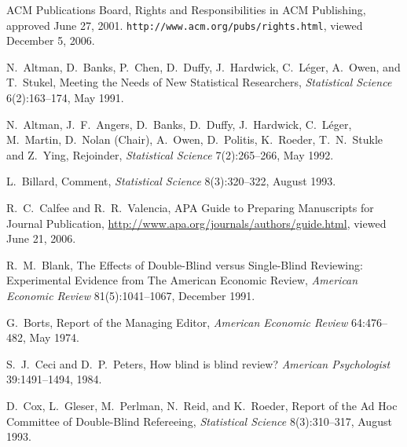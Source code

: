 \documentclass[acmtods,acmnow]{acmtrans2m}
\begin{document}
%
\newcommand{\etalchar}[1]{$^{#1}$}
\begin{thebibliography}{}

{\sc ACM Publications Board}, Rights and Responsibilities in ACM Publishing,
approved June 27, 2001. {\tt http://www.acm.org/pubs/rights.html}, viewed
December 5, 2006.

{\sc N.~Altman, D.~Banks, P.~Chen, D.~Duffy, J.~Hardwick, C.~L\'{e}ger, A.~Owen, and
T.~Stukel}, Meeting the Needs of New Statistical Researchers, {\em
  Statistical Science} 6(2):163--174, May 1991.

{\sc N.~Altman, J.~F.~Angers, D.~Banks, D.~Duffy, J.~Hardwick, C.~L\'{e}ger,
M.~Martin, D.~Nolan (Chair), A.~Owen, D.~Politis, K.~Roeder, T.~N.~Stukle
and Z.~Ying}, Rejoinder, {\em Statistical Science} 7(2):265--266, May 1992.

{\sc L.~Billard}, Comment, {\em Statistical Science} 8(3):320--322, August
1993.

{\sc R.~C.~Calfee and R.~R.~Valencia}, APA Guide to Preparing Manuscripts for
Journal Publication, \url{http://www.apa.org/journals/authors/guide.html},
viewed June 21, 2006.

{\sc R.~M.~Blank}, The Effects of Double-Blind versus Single-Blind Reviewing:
Experimental Evidence from The American Economic Review, {\em American
  Economic Review} 81(5):1041--1067, December 1991.

{\sc G.~Borts}, Report of the Managing Editor, {\em American Economic Review}
64:476--482, May 1974.

{\sc S.~J.~Ceci and D.~P.~Peters}, How blind is blind review? {\em American
  Psychologist} 39:1491--1494, 1984.

{\sc D.~Cox, L.~Gleser, M.~Perlman, N.~Reid, and K.~Roeder}, Report of the Ad Hoc
  Committee of Double-Blind Refereeing, {\em Statistical
  Science} 8(3):310--317, August 1993.


\end{thebibliography}
\end{document}
